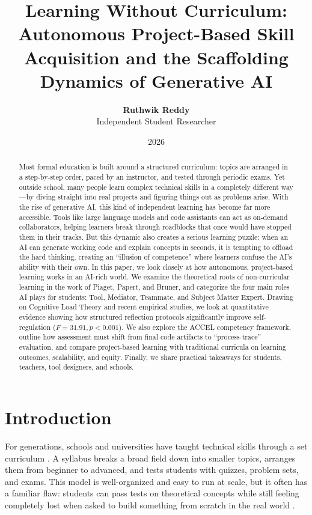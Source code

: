 \documentclass[11pt]{article}
\title{\textbf{\Large Learning Without Curriculum: Autonomous Project-Based Skill Acquisition and the Scaffolding Dynamics of Generative AI}}
\author{\textbf{Ruthwik Reddy}\\Independent Student Researcher}
\date{2026}
\begin{document}
\maketitle

\begin{abstract}
Most formal education is built around a structured curriculum: topics are arranged in a step-by-step order, paced by an instructor, and tested through periodic exams. Yet outside school, many people learn complex technical skills in a completely different way---by diving straight into real projects and figuring things out as problems arise. With the rise of generative AI, this kind of independent learning has become far more accessible. Tools like large language models and code assistants can act as on-demand collaborators, helping learners break through roadblocks that once would have stopped them in their tracks. But this dynamic also creates a serious learning puzzle: when an AI can generate working code and explain concepts in seconds, it is tempting to offload the hard thinking, creating an ``illusion of competence'' where learners confuse the AI's ability with their own. In this paper, we look closely at how autonomous, project-based learning works in an AI-rich world. We examine the theoretical roots of non-curricular learning in the work of Piaget, Papert, and Bruner, and categorize the four main roles AI plays for students: Tool, Mediator, Teammate, and Subject Matter Expert. Drawing on Cognitive Load Theory and recent empirical studies, we look at quantitative evidence showing how structured reflection protocols significantly improve self-regulation ($F = 31.91, p < 0.001$). We also explore the ACCEL competency framework, outline how assessment must shift from final code artifacts to ``process-trace'' evaluation, and compare project-based learning with traditional curricula on learning outcomes, scalability, and equity. Finally, we share practical takeaways for students, teachers, tool designers, and schools.
\end{abstract}

\vspace{0.8em}

\section{Introduction}

For generations, schools and universities have taught technical skills through a set curriculum \citep{blumenfeld1991}. A syllabus breaks a broad field down into smaller topics, arranges them from beginner to advanced, and tests students with quizzes, problem sets, and exams. This model is well-organized and easy to run at scale, but it often has a familiar flaw: students can pass tests on theoretical concepts while still feeling completely lost when asked to build something from scratch in the real world \citep{barron1998,hmelo2004}.
\end{document}
